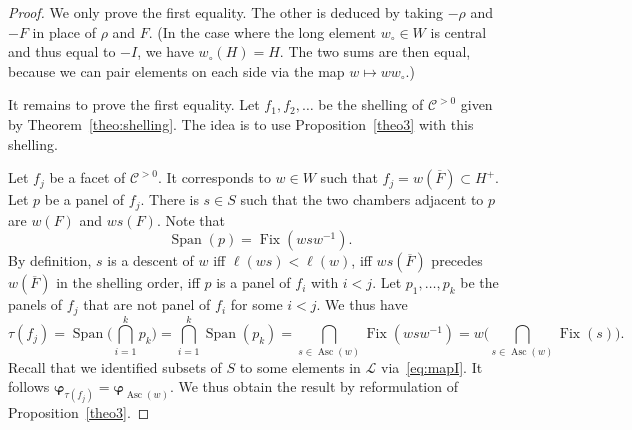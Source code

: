 \documentclass[11pt]{article}
\theoremstyle{definition}
\DeclareMathOperator{\des}{Des}
\DeclareMathOperator{\asc}{Asc}
\DeclareMathOperator{\Span}{Span}
\DeclareMathOperator{\Fix}{Fix}
\newcommand{\bphi}{\boldsymbol{\varphi}}
\newcommand{\LL}{\mathcal{L}}
\newcommand{\CCP}{\mathcal{C}^{>0}}
\begin{document}
\begin{proof}
    We only prove the first equality. The other is deduced by taking $-\rho$ and $-F$ in place of $\rho$ and $F$.  (In the case where the long element $w_\circ \in W$ is central and thus equal to $-I$, we have $w_\circ(H)=H$.  The two sums are then equal, because we can pair elements on each side via the map $w\mapsto w w_\circ$.)
    
    It remains to prove the first equality.  Let $f_1, f_2,\dots $ be the shelling of $\CCP$ given by Theorem~\ref{theo:shelling}.  The idea is to use Proposition~\ref{theo3} with this shelling.

    Let $f_j$ be a facet of $\CCP$.  It corresponds to $w\in W$ such that $f_j = w(\overline{F}) \subset H^+$. Let $p$ be a panel of $f_j$.  There is $s \in S$ such that the two chambers adjacent to $p$ are $w(F)$ and $ws(F)$.  Note that
    \[
        \Span(p) = \Fix(wsw^{-1}).
    \]
    By definition, $s$ is a descent of $w$ iff $\ell(ws)<\ell(w)$, iff $ws(\overline{F})$ precedes $w(\overline{F})$ in the shelling order, iff $p$ is a panel of $f_i$ with $i<j$.  Let $p_1, \dots , p_k$ be the panels of $f_j$ that are not panel of $f_i$ for some $i<j$. We thus have
    \[
        \tau(f_j) 
            = 
        \Span\bigg( \bigcap_{i=1}^k p_k \bigg) 
            = 
        \bigcap_{i=1}^k \Span(p_k)
            =
        \bigcap_{s \in \asc(w)} \Fix(wsw^{-1})
            =
        w\bigg(\bigcap_{s \in \asc(w)} \Fix(s) \bigg).
    \]
    Recall that we identified subsets of $S$ to some elements in $\LL$ via~\eqref{eq:mapI}.  It follows $\bphi_{\tau(f_j)} = \bphi_{\asc(w)}$.  We thus obtain the result by reformulation of Proposition~\ref{theo3}.
\end{proof}
\end{document}
